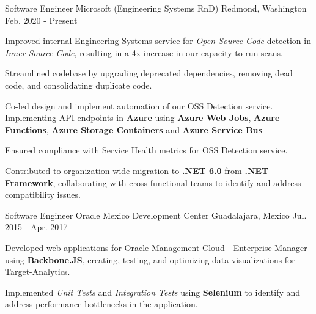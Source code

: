 

\begin{cventries}

  \cventry
    {Software Engineer} %
    {Microsoft (Engineering Systems RnD)} %
    {Redmond, Washington} %
    {Feb. 2020 - Present} %
    {
      \begin{cvitems} %
        \item {
          Improved internal Engineering Systems service for \textit{Open-Source Code} detection in \textit{Inner-Source Code},
          resulting in a 4x increase in our capacity to run scans.
          }
        \item {
          Streamlined codebase by upgrading deprecated dependencies, 
          removing dead code, and consolidating duplicate code.
        }
        \item {
          Co-led design and implement automation of our OSS Detection service. 
          Implementing API endpoints in \textbf{Azure} using \textbf{Azure Web Jobs}, \textbf{Azure Functions}, \textbf{Azure Storage Containers} and \textbf{Azure Service Bus}
        }
        \item {
          Ensured compliance with Service Health metrics for OSS Detection service.
        }
        \item {
          Contributed to organization-wide migration to \textbf{.NET 6.0} from \textbf{.NET Framework}, 
          collaborating with cross-functional teams to identify and address compatibility issues.
        }  
      \end{cvitems}
    }

  \cventry
    {Software Engineer} %
    {Oracle Mexico Development Center} %
    {Guadalajara, Mexico} %
    {Jul. 2015 - Apr. 2017} %
    {
        \begin{cvitems}
          \item {Developed web applications for Oracle Management Cloud - Enterprise Manager using \textbf{Backbone.JS},
          creating, testing, and optimizing data visualizations for Target-Analytics.}
          \item {Implemented \textit{Unit Tests} and \textit{Integration Tests} using \textbf{Selenium}
          to identify and address performance bottlenecks in the application.}
        \end{cvitems}
    }


\end{cventries}
